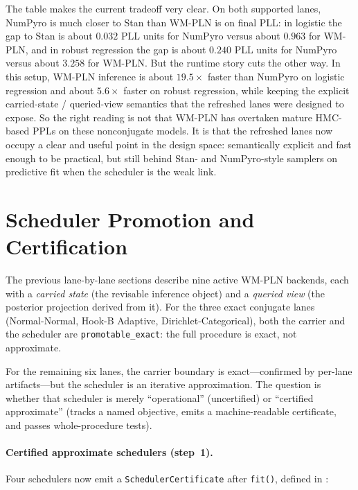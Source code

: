 \documentclass[11pt,openany]{report}
\begin{document}
The table makes the current tradeoff very clear.  On both supported lanes,
NumPyro is much closer to Stan than WM-PLN is on final PLL: in logistic the gap
to Stan is about $0.032$ PLL units for NumPyro versus about $0.963$ for
WM-PLN, and in robust regression the gap is about $0.240$ PLL units for
NumPyro versus about $3.258$ for WM-PLN.  But the runtime story cuts the other
way.  In this setup, WM-PLN inference is about $19.5\times$ faster than
NumPyro on logistic regression and about $5.6\times$ faster on robust
regression, while keeping the explicit carried-state / queried-view semantics
that the refreshed lanes were designed to expose.  So the right reading is not
that WM-PLN has overtaken mature HMC-based PPLs on these nonconjugate models.
It is that the refreshed lanes now occupy a clear and useful point in the
design space: semantically explicit and fast enough to be practical, but still
behind Stan- and NumPyro-style samplers on predictive fit when the scheduler is
the weak link.

\section{Scheduler Promotion and Certification}
\label{app:pplbench-scheduler-promotion}

The previous lane-by-lane sections describe nine active WM-PLN backends,
each with a \emph{carried state} (the revisable inference object) and a
\emph{queried view} (the posterior projection derived from it).  For the
three exact conjugate lanes (Normal-Normal, Hook-B Adaptive, Dirichlet-Categorical),
both the carrier and the scheduler are \texttt{promotable\_exact}: the
full procedure is exact, not approximate.

For the remaining six lanes, the carrier boundary is exact---confirmed by
per-lane  artifacts---but the scheduler
is an iterative approximation.  The question is whether that scheduler is
merely ``operational'' (uncertified) or ``certified approximate'' (tracks a
named objective, emits a machine-readable certificate, and passes
whole-procedure tests).

\paragraph{Certified approximate schedulers (step~1).}
Four schedulers now emit a \texttt{SchedulerCertificate} after \texttt{fit()},
defined in :
\end{document}
